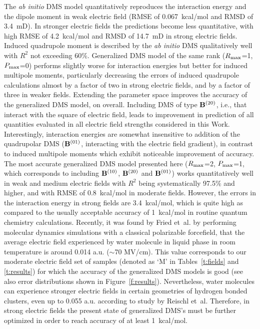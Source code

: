 \documentclass[aip,amsmath,amssymb,reprint,floatfix]{revtex4-1}
\begin{document}
The \emph{ab initio} DMS model quantitatively reproduces the interaction energy and the dipole moment 
in weak electric field (RMSE of 0.067~kcal/mol and RMSD of 3.4~mD). In stronger electric fields
the predictions become less quantitative, with high RMSE of 4.2~kcal/mol and RMSD of 14.7~mD in strong electric fields.
Induced quadrupole moment is described by the \emph{ab initio} DMS qualitatively well with $R^2$ not exceeding
60\%. Generalized DMS model of the same rank ($R_{\rm max}$=1, $P_{\rm max}$=0) performs slightly worse
for interaction energies but better for induced multipole moments, particularly decreasing the errors of induced quadrupole
calculations almost by a factor of two in strong electric fields, and by a factor of three in weaker fields.
Extending the parameter space improves the accuracy of the generalized DMS model, on overall. 
Including DMS of type ${\bf B}^{(20)}$, i.e., that interact with the square of electric field,
leads to improvement in prediction of all quantities evaluated in all electric field strengths considered in this Work. 
Interestingly, interaction energies are somewhat insensitive to addition of the quadrupolar DMS 
(${\bf B}^{(01)}$, interacting with the electric field gradient), in contrast to induced multipole moments
which exhibit noticeable improvement of accuracy. The most accurate generalized DMS model presented here 
($R_{\rm max}$=2, $P_{\rm max}$=1, which corresponds to including ${\bf B}^{(10)}$, ${\bf B}^{(20)}$ and ${\bf B}^{(01)}$)
works quantitatively well in weak and medium electric fields with $R^2$ being systematically 97.5\% and higher,
and with RMSE of 0.8~kcal/mol in moderate fields. 
However, the errors in the interaction energy
in strong fields are 3.4~kcal/mol, which is quite high as compared to the usually acceptable accuracy 
of 1~kcal/mol in routine quantum chemistry calculations. 
Recently, it was found by Fried et~al. by performing molecular dynamics simulations with a classical 
polarizable forcefield, that the average electric field experienced by water molecule in liquid phase
in room temperature is around 0.014 a.u. ($\sim$70 MV/cm).\cite{Fried.Wang.Boxer.Ren.Pande.JPCB.2013}
This value corresponds to our moderate electric field set of samples (denoted as `M' in Tables~\ref{t:fields}
and \ref{t:results}) for which the
accuracy of the generalized DMS models is good 
(see also error distributions shown in Figure~\ref{f:results}).
Nevertheless, water molecules can experience
stronger electric fields in certain geometries of hydrogen bonded clusters, 
even up to 0.055 a.u. according to study by Reischl et~al.\cite{Reischl.Kofinger.Dellago.MolPhys.2009} 
Therefore, in strong electric fields
the present state of generalized DMS's must be further optimized in order to reach accuracy of at least
1~kcal/mol. 
\end{document}
